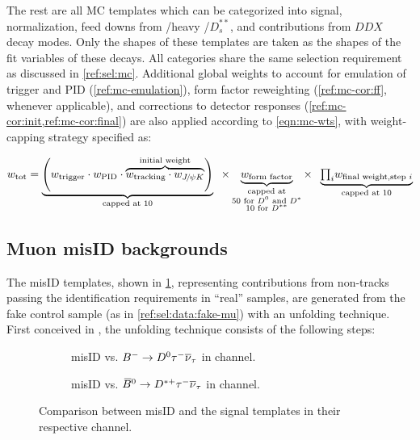 The rest are all MC templates which can be categorized into signal,
normalization, feed downs from \Dstst/heavy \Dstst/$D^{**}_s$, and contributions
from $DDX$ decay modes.
Only the shapes of these templates are taken as the shapes of the fit variables
of these decays.
All categories share the same selection requirement as discussed in
\cref{ref:sel:mc}.
Additional global weights to account for emulation of trigger and PID
(\cref{ref:mc-emulation}),
form factor reweighting (\cref{ref:mc-cor:ff}, whenever applicable),
and corrections to detector responses (\cref{ref:mc-cor:init,ref:mc-cor:final})
are also applied according to \cref{eqn:mc-wts},
with weight-capping strategy specified as:

\begin{equation}
    w_\text{tot} = \underbrace{\left(
            w_\text{trigger} \cdot w_\text{PID} \cdot
            \overbrace{
                w_\text{tracking} \cdot w_{\jpsi\kaon}
            }^\text{initial weight}
        \right)}_\text{capped at 10} \;\; \times
        \underbrace{w_\text{form factor}}_{\substack{
            \text{capped at} \\
            \text{50 for \Dz and \Dstar} \\
            \text{10 for $D^{**}$}
        }} \times \;\;
        \underbrace{
            {\textstyle\prod_i} w_\text{final weight,step $i$}
        }_\text{capped at 10}
        \label{eqn:mc-wts}
\end{equation}


\subsection{Muon misID backgrounds}
\label{ref:fit:tmpl:misid}

The \muon misID templates,
shown in \cref{fig:misid-vs-sig},
representing contributions from non-\muon tracks passing the \muon
identification requirements in ``real'' \muon samples,
are generated from the fake \muon control sample
(as in \cref{ref:sel:data:fake-mu}) with an unfolding technique.
First conceived in \cite{LHCb-ANA-2016-059}, the unfolding technique
consists of the following steps:

\begin{figure}[!htb]
    \centering
    \begin{subfigure}{0.9\textwidth}
        \centering
        \caption{
            \muon misID vs. ${{{B}^-}} \rightarrow {\ensuremath{{D}^0}}{\ensuremath{\tau^-}}{\ensuremath{{\overline{\nu}}_\tau}}$ in \Dz channel.
        }
    \end{subfigure}

    \begin{subfigure}{0.9\textwidth}
        \centering
        \caption{
            \muon misID vs. ${{\kern 0.18em\overline{\kern -0.18em B}}{}^0} \rightarrow {\ensuremath{{D}^{*+}}}{\ensuremath{\tau^-}}{\ensuremath{{\overline{\nu}}_\tau}}$ in \Dstar channel.
        }
    \end{subfigure}

    \caption{
        Comparison between misID and the signal templates in their
        respective channel.
    }
    \label{fig:misid-vs-sig}
\end{figure}

